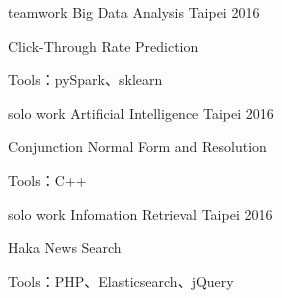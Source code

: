 
\begin{cventries}

  \cventry
    {teamwork} %
    {Big Data Analysis} %
    {Taipei} %
    {2016} %
    {
      \begin{cvitems} %
        \item {Click-Through Rate Prediction}
        \item {Tools：pySpark、sklearn}
      \end{cvitems}
    }

  \cventry
    {solo work} %
    {Artificial Intelligence} %
    {Taipei} %
    {2016} %
    {
      \begin{cvitems} %
        \item {Conjunction Normal Form and Resolution}
        \item {Tools：C++}
      \end{cvitems}
    }

  \cventry
    {solo work} %
    {Infomation Retrieval} %
    {Taipei} %
    {2016} %
    {
      \begin{cvitems} %
        \item {Haka News Search}
        \item {Tools：PHP、Elasticsearch、jQuery}
      \end{cvitems}
    }


\end{cventries}

